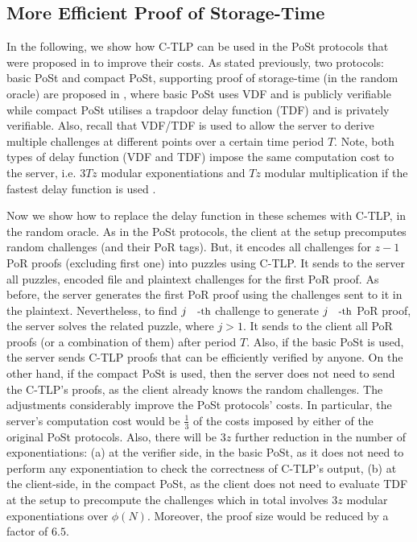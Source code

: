 
\subsection{More Efficient Proof of Storage-Time}\label{More-Efficient-Proof-of-Storage-Time}

In the following, we show how C-TLP can be used in the PoSt protocols that were proposed in  \cite{Storage-Time} to improve their costs. As stated previously,  two protocols: basic PoSt and compact PoSt, supporting proof of storage-time (in the random oracle) are proposed in \cite{Storage-Time}, where  basic PoSt uses VDF and is publicly verifiable while compact PoSt  utilises a trapdoor delay function (TDF) and is privately verifiable. Also, recall that VDF/TDF is used to allow the server to derive multiple challenges at different points over a certain time period $T$. Note, both types of delay function (VDF and TDF) impose the same computation cost to the server, i.e. $3Tz$ modular exponentiations and $Tz$ modular multiplication if the fastest delay function is used \cite{Wesolowski19}. 

Now we show how to replace the delay function in these schemes with C-TLP, in the random oracle.  As in the PoSt protocols, the client at the setup precomputes random challenges (and their PoR tags). But, it encodes all challenges for $z-1$ PoR proofs (excluding first one)  into puzzles using C-TLP. It sends to the server all puzzles, encoded file and plaintext challenges for the first PoR proof. As before, the server generates the first PoR proof using the challenges sent to it in the plaintext. Nevertheless, to find $j\text{\small{-th}}$ challenge to generate  $j\text{\small{-th}}$ PoR proof, the server solves the related puzzle, where $j>1$. It sends to the client all PoR proofs (or a combination of them) after period $T$. Also, if the basic PoSt  is used,  the server sends C-TLP proofs that can be efficiently verified by anyone. On the other hand, if the compact PoSt is used, then the server does not need to send the C-TLP's proofs, as the client already knows the random challenges. The adjustments considerably improve the PoSt protocols' costs. In particular,  the server's computation cost would be $\frac{1}{3}$ of the costs imposed by either of the original PoSt protocols. Also,  there will be $3z$ further reduction in the number of exponentiations:  (a) at the verifier side, in the basic PoSt, as it does not need to perform any exponentiation to check the correctness of C-TLP's output,  (b) at the client-side, in the compact PoSt,  as the client does not need to evaluate TDF at the setup to precompute the challenges which in total involves $3z$ modular exponentiations over $\phi(N)$. Moreover, the proof size would be reduced by a factor of $6.5$.

